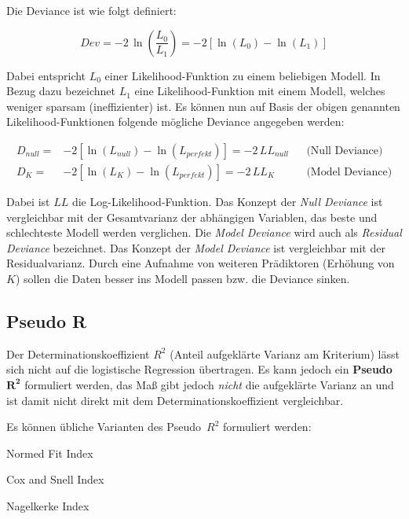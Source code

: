 \documentclass{article}
\numberwithin{equation}{section}
\begin{document}
Die Deviance ist wie folgt definiert:

\begin{equation}
Dev = -2\,\ln \left( \frac{L_0}{L_1} \right) = -2 \left[ \ln(L_0) - \ln(L_1) \right]
\end{equation}

Dabei entspricht $L_0$ einer Likelihood-Funktion zu einem beliebigen Modell. In Bezug dazu bezeichnet $L_1$ eine Likelihood-Funktion mit einem Modell, welches weniger sparsam (ineffizienter) ist. Es können nun auf Basis der obigen genannten Likelihood-Funktionen folgende mögliche Deviance angegeben werden:

\begin{subequations}
\begin{align}
D_{null} = & -2 \left[ \ln(L_{null}) - \ln(L_{perfekt}) \right] = -2\,LL_{null} && \text{(Null Deviance)}\\
D_K = & -2 \left[ \ln(L_{K}) - \ln(L_{perfekt}) \right] = -2\,LL_K && \text{(Model Deviance)}
\end{align}
\end{subequations}

Dabei ist $LL$ die Log-Likelihood-Funktion. Das Konzept der \emph{Null Deviance} ist vergleichbar mit der Gesamtvarianz der abhängigen Variablen, das beste und schlechteste Modell werden verglichen. Die \emph{Model Deviance} wird auch als \emph{Residual Deviance} bezeichnet. Das Konzept der \emph{Model Deviance} ist vergleichbar mit der Residualvarianz. Durch eine Aufnahme von weiteren Prädiktoren (Erhöhung von $K$) sollen die Daten besser ins Modell passen bzw. die Deviance sinken.

\subsection{Pseudo R}

Der Determinationskoeffizient $R^2$ (Anteil aufgeklärte Varianz am Kriterium) lässt sich nicht auf die logistische Regression übertragen. Es kann jedoch ein \textbf{Pseudo}~$\mathbf{R^2}$ formuliert werden, das Maß gibt jedoch \emph{nicht} die aufgeklärte Varianz an und ist damit nicht direkt mit dem Determinationskoeffizient vergleichbar.

Es können übliche Varianten des Pseudo~$R^2$ formuliert werden:

\begin{compactitem}
\item Normed Fit Index
\item Cox and Snell Index
\item Nagelkerke Index
\end{compactitem}
\end{document}
